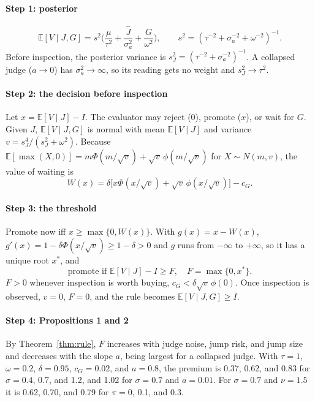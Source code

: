 \documentclass[acmsmall,screen,review]{acmart}
\theoremstyle{acmdefinition}
\begin{document}
\paragraph{Step 1: posterior}
\begin{equation*}
\mathbb{E}[V \mid J,G] = s^2\Big(\frac{\mu}{\tau^2} + \frac{\hat{J}}{\sigma_a^2} + \frac{G}{\omega^2}\Big), \qquad s^2 = (\tau^{-2} + \sigma_a^{-2} + \omega^{-2})^{-1}.
\end{equation*}
Before inspection, the posterior variance is $s_J^2 = (\tau^{-2} + \sigma_a^{-2})^{-1}$. A collapsed judge ($a \to 0$) has $\sigma_a^2 \to \infty$, so its reading gets no weight and $s_J^2 \to \tau^2$.

\paragraph{Step 2: the decision before inspection} Let $x = \mathbb{E}[V \mid J] - I$. The evaluator may reject (0), promote ($x$), or wait for $G$. Given $J$, $\mathbb{E}[V \mid J,G]$ is normal with mean $\mathbb{E}[V\mid J]$ and variance $v = s_J^4/(s_J^2 + \omega^2)$. Because $\mathbb{E}[\max(X,0)] = m\Phi(m/\sqrt{v}) + \sqrt{v}\,\phi(m/\sqrt{v})$ for $X \sim N(m,v)$, the value of waiting is
\begin{equation*}
W(x) = \delta\big[x\Phi(x/\sqrt{v}) + \sqrt{v}\,\phi(x/\sqrt{v})\big] - c_G.
\end{equation*}

\paragraph{Step 3: the threshold} Promote now iff $x \ge \max\{0, W(x)\}$. With $g(x) = x - W(x)$, $g'(x) = 1 - \delta\Phi(x/\sqrt{v}) \ge 1 - \delta > 0$ and $g$ runs from $-\infty$ to $+\infty$, so it has a unique root $x^*$, and
\begin{equation}
\text{promote if } \mathbb{E}[V\mid J] - I \ge F, \quad F = \max\{0, x^*\}. \tag{A.1}
\end{equation}
$F > 0$ whenever inspection is worth buying, $c_G < \delta\sqrt{v}\,\phi(0)$. Once inspection is observed, $v = 0$, $F = 0$, and the rule becomes $\mathbb{E}[V\mid J,G] \ge I$.

\paragraph{Step 4: Propositions 1 and 2} By Theorem~\ref{thm:rule}, $F$ increases with judge noise, jump risk, and jump size and decreases with the slope $a$, being largest for a collapsed judge. With $\tau = 1$, $\omega = 0.2$, $\delta = 0.95$, $c_G = 0.02$, and $a = 0.8$, the premium is 0.37, 0.62, and 0.83 for $\sigma = 0.4$, 0.7, and 1.2, and 1.02 for $\sigma = 0.7$ and $a = 0.01$. For $\sigma = 0.7$ and $\nu = 1.5$ it is 0.62, 0.70, and 0.79 for $\pi = 0$, 0.1, and 0.3.
\end{document}
